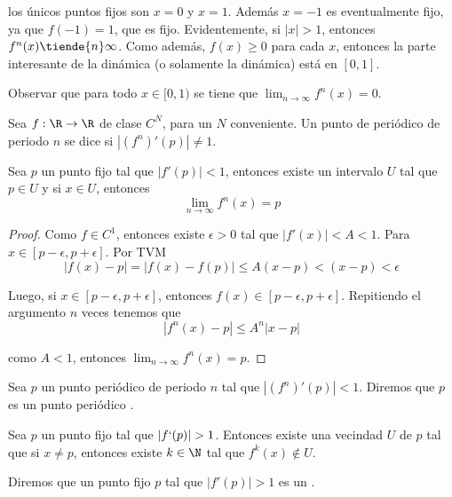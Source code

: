 \documentclass[	docname= Sistemas\ Din\'amicos,
				finished=1,
				semester=1,
				year=2017,
				professor=Godofredo\ Iommi,
				sigla=MAT2565]{apunte}
\begin{document}
los únicos puntos fijos son $x = 0$ y $x = 1$. Además $x = -1$ es eventualmente fijo, ya que $f(-1) = 1$, que es fijo. Evidentemente, si $|x| > 1$, entonces $f^{n}(x) \tiende{n} \infty$. Como además, $f(x) \geq 0$ para cada $x$, entonces la parte interesante de la dinámica (o solamente la dinámica) está en $[0,1]$.

Observar que para todo $x \in [0,1)$ se tiene que $\lim_{n \to \infty} f^{n}(x) = 0$.

\begin{defn} Sea $f: \R \to \R$ de clase $C^{N}$, para un $N$ conveniente. Un punto de periódico de periodo $n$ se dice  si $|(f^{n})'(p)| \neq 1$.
\end{defn}

\begin{lem} Sea $p$ un punto fijo tal que $|f'(p)| < 1$, entonces existe un intervalo $U$ tal que $p \in U$ y si $x \in U$, entonces
	$$\lim_{n \to \infty} f^{n}(x) = p$$
\end{lem}

\begin{proof} Como $f \in C^{1}$, entonces existe $\epsilon > 0$ tal que $|f'(x)| < A < 1$. Para $x \in [p-\epsilon, p+\epsilon]$. Por TVM
	$$|f(x) - p| = |f(x) - f(p)| \leq A (x - p) < (x-p) < \epsilon$$

Luego, si $x \in [p-\epsilon, p +\epsilon]$, entonces $f(x)  \in [p-\epsilon, p + \epsilon]$. Repitiendo el argumento $n$ veces tenemos que
	$$|f^{n}(x) - p| \leq A^{n}|x-p|$$

como $A < 1$, entonces $\lim_{n \to \infty} f^{n}(x) = p$.
\end{proof}

\begin{defn} Sea $p$ un punto periódico de periodo $n$ tal que $|(f^{n})'(p)| < 1$. Diremos que $p$ es un punto periódico .
\end{defn}

\begin{lem} Sea $p$ un punto fijo tal que $|f`(p)| > 1$. Entonces existe una vecindad $U$ de $p$ tal que si $x \neq p$, entonces existe $k \in \N$ tal que $f^{k}(x) \notin U$.
\end{lem}

\begin{defn} Diremos que un punto fijo $p$ tal que $|f'(p)| > 1$ es un .
\end{defn}
\end{document}
